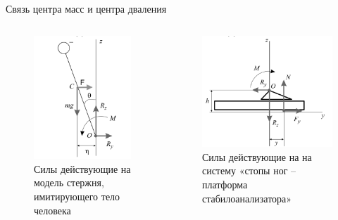 \documentclass[10pt]{beamer}
\begin{document}
\begin{frame}{Связь центра масс и центра дваления}
		\begin{columns}
		\begin{figure}[h!]
			\includegraphics[width=0.8\linewidth]{images/body.png}
			\caption{Силы действующие на модель стержня, имитирующего тело человека}
		\end{figure}
		\begin{figure}[h!]
			\includegraphics[width=0.8\linewidth]{images/foot.png}
			\caption{Силы действующие на на систему «стопы ног – платформа стабилоанализатора» }
		\end{figure}
	\end{columns}

\end{frame}
\end{document}
